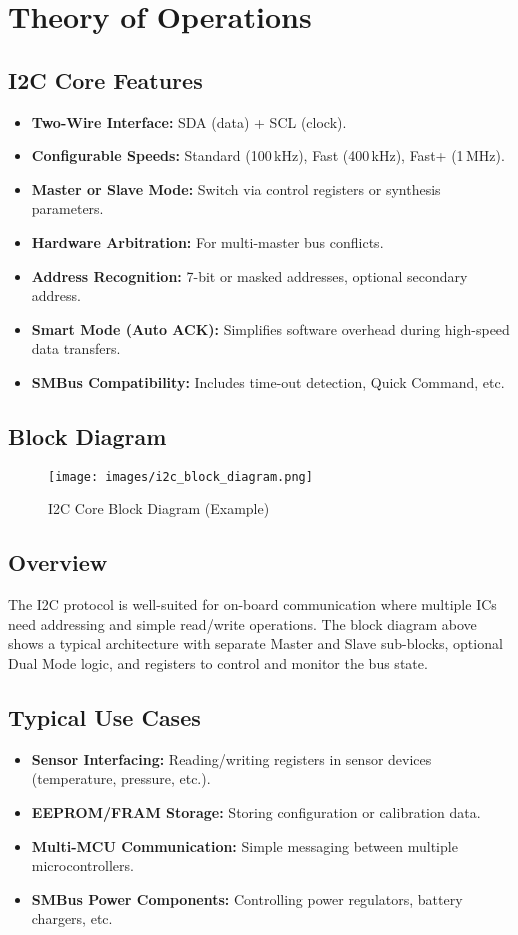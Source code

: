 \section{Theory of Operations}

\subsection{I2C Core Features}
\begin{itemize}
    \item \textbf{Two-Wire Interface:} SDA (data) + SCL (clock).
    \item \textbf{Configurable Speeds:} Standard (100\,kHz), Fast (400\,kHz), Fast+ (1\,MHz).
    \item \textbf{Master or Slave Mode:} Switch via control registers or synthesis parameters.
    \item \textbf{Hardware Arbitration:} For multi-master bus conflicts.
    \item \textbf{Address Recognition:} 7-bit or masked addresses, optional secondary address.
    \item \textbf{Smart Mode (Auto ACK):} Simplifies software overhead during high-speed data transfers.
    \item \textbf{SMBus Compatibility:} Includes time-out detection, Quick Command, etc.
\end{itemize}

\subsection{Block Diagram}
\begin{figure}[H]
    \centering
    \texttt{[image: images/i2c\_block\_diagram.png]} %
    \caption{I2C Core Block Diagram (Example)}
    \label{fig:i2c_block_diagram}
\end{figure}

\subsection{Overview}
The I2C protocol is well-suited for on-board communication where multiple ICs need addressing and simple read/write operations. The block diagram above shows a typical architecture with separate Master and Slave sub-blocks, optional Dual Mode logic, and registers to control and monitor the bus state.

\subsection{Typical Use Cases}
\begin{itemize}
    \item \textbf{Sensor Interfacing:} Reading/writing registers in sensor devices (temperature, pressure, etc.).
    \item \textbf{EEPROM/FRAM Storage:} Storing configuration or calibration data.
    \item \textbf{Multi-MCU Communication:} Simple messaging between multiple microcontrollers.
    \item \textbf{SMBus Power Components:} Controlling power regulators, battery chargers, etc.
\end{itemize}
